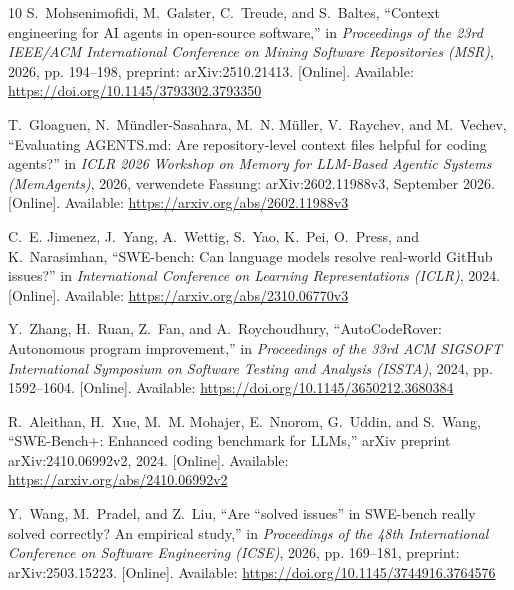 \documentclass[conference]{IEEEtran}
\begin{document}
\begin{thebibliography}{10}
\BIBentryALTinterwordspacing
S.~Mohsenimofidi, M.~Galster, C.~Treude, and S.~Baltes, ``Context engineering
  for {AI} agents in open-source software,'' in \emph{Proceedings of the 23rd
  IEEE/ACM International Conference on Mining Software Repositories (MSR)},
  2026, pp. 194--198, preprint: arXiv:2510.21413. [Online]. Available:
  \url{https://doi.org/10.1145/3793302.3793350}
\BIBentrySTDinterwordspacing

\BIBentryALTinterwordspacing
T.~Gloaguen, N.~M{\"u}ndler-Sasahara, M.~N. M{\"u}ller, V.~Raychev, and
  M.~Vechev, ``Evaluating {AGENTS.md}: Are repository-level context files
  helpful for coding agents?'' in \emph{ICLR 2026 Workshop on Memory for
  LLM-Based Agentic Systems (MemAgents)}, 2026, verwendete Fassung:
  arXiv:2602.11988v3, September 2026. [Online]. Available:
  \url{https://arxiv.org/abs/2602.11988v3}
\BIBentrySTDinterwordspacing

\BIBentryALTinterwordspacing
C.~E. Jimenez, J.~Yang, A.~Wettig, S.~Yao, K.~Pei, O.~Press, and K.~Narasimhan,
  ``{SWE-bench}: Can language models resolve real-world {GitHub} issues?'' in
  \emph{International Conference on Learning Representations (ICLR)}, 2024.
  [Online]. Available: \url{https://arxiv.org/abs/2310.06770v3}
\BIBentrySTDinterwordspacing

\BIBentryALTinterwordspacing
Y.~Zhang, H.~Ruan, Z.~Fan, and A.~Roychoudhury, ``{AutoCodeRover}: Autonomous
  program improvement,'' in \emph{Proceedings of the 33rd ACM SIGSOFT
  International Symposium on Software Testing and Analysis (ISSTA)}, 2024, pp.
  1592--1604. [Online]. Available:
  \url{https://doi.org/10.1145/3650212.3680384}
\BIBentrySTDinterwordspacing

\BIBentryALTinterwordspacing
R.~Aleithan, H.~Xue, M.~M. Mohajer, E.~Nnorom, G.~Uddin, and S.~Wang,
  ``{SWE-Bench+}: Enhanced coding benchmark for {LLMs},'' arXiv preprint
  arXiv:2410.06992v2, 2024. [Online]. Available:
  \url{https://arxiv.org/abs/2410.06992v2}
\BIBentrySTDinterwordspacing

\BIBentryALTinterwordspacing
Y.~Wang, M.~Pradel, and Z.~Liu, ``Are ``solved issues'' in {SWE-bench} really
  solved correctly? {An} empirical study,'' in \emph{Proceedings of the 48th
  International Conference on Software Engineering (ICSE)}, 2026, pp. 169--181,
  preprint: arXiv:2503.15223. [Online]. Available:
  \url{https://doi.org/10.1145/3744916.3764576}
\BIBentrySTDinterwordspacing


\end{thebibliography}
\end{document}
